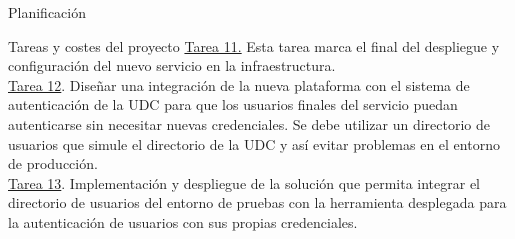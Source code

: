 \begin{chapter}{Planificación}
\begin{section}{Tareas y costes del proyecto}
\underline{Tarea 11.} Esta tarea marca el final del despliegue y configuración del nuevo servicio en la infraestructura.\\
\underline{Tarea 12}. Diseñar una integración de la nueva plataforma con el sistema de autenticación de la UDC para que los usuarios finales del servicio puedan autenticarse sin necesitar nuevas credenciales. Se debe utilizar un directorio de usuarios que simule el directorio de la UDC y así evitar problemas en el entorno de producción.\\
\underline{Tarea 13}. Implementación y despliegue de la solución que permita integrar el directorio de usuarios del entorno de pruebas con la herramienta desplegada para la autenticación de usuarios con sus propias credenciales.\\

\end{section}
\end{chapter}
